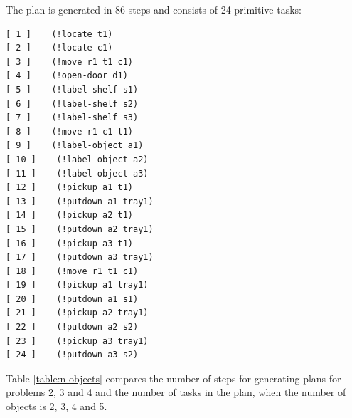 \documentclass[paper=a4, fontsize=11pt]{scrartcl}
\begin{document}
	\vspace{5mm}

	The plan is generated in 86 steps and consists of 24 primitive tasks: \\

\begin{lstlisting}
[ 1 ]    (!locate t1)
[ 2 ]    (!locate c1)
[ 3 ]    (!move r1 t1 c1)
[ 4 ]    (!open-door d1)
[ 5 ]    (!label-shelf s1)
[ 6 ]    (!label-shelf s2)
[ 7 ]    (!label-shelf s3)
[ 8 ]    (!move r1 c1 t1)
[ 9 ]    (!label-object a1)
[ 10 ]    (!label-object a2)
[ 11 ]    (!label-object a3)
[ 12 ]    (!pickup a1 t1)
[ 13 ]    (!putdown a1 tray1)
[ 14 ]    (!pickup a2 t1)
[ 15 ]    (!putdown a2 tray1)
[ 16 ]    (!pickup a3 t1)
[ 17 ]    (!putdown a3 tray1)
[ 18 ]    (!move r1 t1 c1)
[ 19 ]    (!pickup a1 tray1)
[ 20 ]    (!putdown a1 s1)
[ 21 ]    (!pickup a2 tray1)
[ 22 ]    (!putdown a2 s2)
[ 23 ]    (!pickup a3 tray1)
[ 24 ]    (!putdown a3 s2)
\end{lstlisting}

\vspace{5mm}

	Table \ref{table:n-objects} compares the number of steps for generating plans for problems 2, 3 and 4 and the number of tasks in the plan, when the number of objects is 2, 3, 4 and 5.
\end{document}
